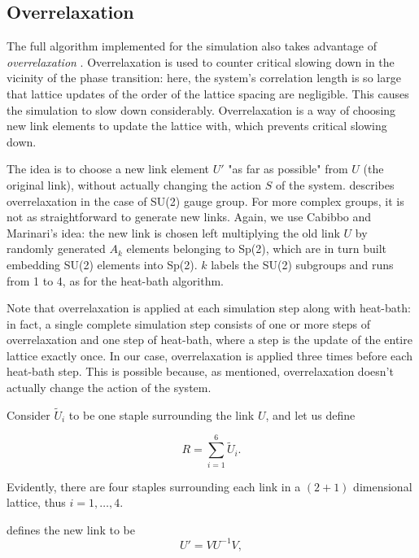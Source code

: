 \documentclass[reqno,12pt]{article}
\numberwithin{equation}{section}
\begin{document}
\subsection{Overrelaxation} \label{overrelaxation}

The full algorithm implemented for the simulation also takes advantage of \textit{overrelaxation} \cite{montvay}.
Overrelaxation is used to counter critical slowing down in the vicinity of the phase transition: here,
the system's correlation length is so large that lattice updates of the order of the lattice spacing are
negligible. This causes the simulation to slow down considerably. 
Overrelaxation is a way of choosing new link elements to update the lattice with, which prevents critical
slowing down. 

The idea is to choose a new link element $U'$ "as far as possible" from $U$ (the original link), without actually changing the
action $S$ of the system. \cite{montvay} describes overrelaxation in the case of SU(2) gauge group. For more
complex groups, it is not as straightforward to generate new links. Again, we use Cabibbo and Marinari's idea:
the new link is chosen left multiplying the old link $U$ by randomly generated $A_k$ elements belonging
to Sp(2), which are in turn built embedding SU(2) elements into Sp(2). $k$ labels the SU(2) subgroups and runs
from 1 to 4, as for the heat-bath algorithm. 

Note that overrelaxation is applied at each simulation step along with heat-bath: in fact,
a single complete simulation step consists of one or more steps of overrelaxation and one step of heat-bath, where
a step is the update of the entire lattice exactly once. In our case, overrelaxation is applied three times
before each heat-bath step. This is possible because, as mentioned, overrelaxation doesn't actually change
the action of the system.

Consider $\widetilde{U}_i$ to be one staple surrounding the link $U$, and let us define

\begin{equation}
	R = \sum_{i = 1}^6 \widetilde{U}_i.
\end{equation}

Evidently, there are four staples surrounding each link in a $(2+1)$ dimensional lattice, thus $i = 1,\dots,4$.

\cite{montvay} defines the new link to be
\begin{equation}
	U' = V U^{-1} V,
\end{equation}
\end{document}
